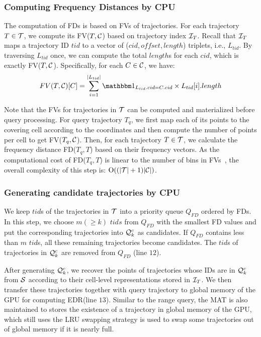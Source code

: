 \documentclass[10pt,conference,letterpaper]{IEEEtran}
\newcommand{\rangeq}{{{\cal Q}_r}\xspace}
\newcommand{\simcand}{{{\cal Q}_k^c}\xspace}
\newcommand{\alltraj}{{{\cal T}}\xspace}
\newcommand{\allcell}{{\cal C}\xspace}
\newcommand{\trajtable}{{\cal S}\xspace}
\newcommand{\trajindex}{{{\cal I}_T}\xspace}
\newcommand{\bigoh}{{\rm O}\xspace}
\begin{document}
\subsubsection{Computing Frequency Distances by CPU}
The computation of FDs is based on FVs of trajectories. For each trajectory $T\in\alltraj$, we compute its FV($T,\allcell$) based on trajectory index $\trajindex$. Recall that $\trajindex$ maps a trajectory ID $tid$ to a vector of ($cid, offset, length$) triplets, i.e., $L_{tid}$. By traversing $L_{tid}$ once, we can compute the total $length$s for each $cid$, which is exactly FV($T,\allcell$). Specifically, for each $C\in\allcell$, we have:
\begin{equation}
\small
	FV(T,\allcell)[C] = \sum_{i=1}^{|L_{tid}|} {{\mathbbm 1}_{L_{tid}.cid = C.cid} \times L_{tid}[i].length }
\end{equation}

Note that the FVs for trajectories in $\alltraj$ can be computed and materialized before query processing. For query trajectory $T_q$, we first map each of its points to the covering cell according to the coordinates and then compute the number of points per cell to get FV($T_q, \allcell$). Then, for each trajectory $T\in\alltraj$, we calculate the frequency distance FD($T_q, T$) based on their frequency vectors.
%
As the computational cost of FD($T_q, T$) is linear to the number of bins in FVs~\cite{DBLP:conf/sigmod/ChenOO05}, the overall complexity of this step is: $\bigoh((|\alltraj|+1)|\allcell|)$.







\subsubsection{Generating candidate trajectories by CPU}
We keep $tid$s of the trajectories in $\alltraj$ into a priority queue ${Q}_{FD}$ ordered by FDs. In this step, we choose $m(\geq k)$  $tids$ from ${Q}_{FD}$ with the smallest FD values and put the corresponding trajectories into $\simcand$ as candidates. If ${Q}_{FD}$ contains less than $m$ $tid$s, all these remaining trajectories become candidates. The $tid$s of trajectories in $\simcand$ are removed from ${Q}_{FD}$ (line $12$).

After generating $\simcand$, we recover the points of trajectories whose IDs are in $\simcand$ from $\trajtable$ according to their cell-level representations stored in $\trajindex$. We then transfer these trajectories together with query trajectory to global memory of the GPU for computing EDR(line $13$).
Similar to the range query, the MAT is also maintained to stores the existence of a trajectory in global memory of the GPU, which still uses the LRU swapping strategy is used to swap some trajectories out of global memory if it is nearly full.
\end{document}
